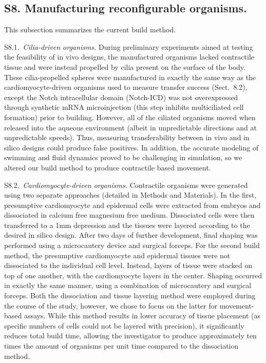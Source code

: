 \vspace{1em} 


\subsection*{S8. Manufacturing reconfigurable organisms.}

This subsection summarizes the current build method.

\vspace{1em}

S8.1.~\textit{Cilia-driven organisms.}
During preliminary experiments aimed at testing the feasibility of in vivo designs, the manufactured organisms lacked contractile tissue and were instead propelled by cilia present on the surface of the body. 
These cilia-propelled spheres were manufactured in exactly the same way as the cardiomyocyte-driven organisms used to measure transfer success (Sect.~8.2), except the Notch intracellular domain (Notch-ICD) was not overexpressed through synthetic mRNA microinjection (this step inhibits multiciliated cell formation) prior to building. 
However, all of the ciliated organisms moved when released into the aqueous environment (albeit in unpredictable directions and at unpredictable speeds). 
Thus, measuring transferability between in vivo and in silico designs could produce false positives. 
In addition, the accurate modeling of swimming and fluid dynamics proved to be challenging in simulation, so we altered our build method to produce contractile based movement.

\vspace{1em}

S8.2.~\textit{Cardiomyocyte-driven organisms.}
Contractile organisms were generated using two separate approaches (detailed in Methods and Materials). 
In the first, presumptive cardiomyocyte and epidermal cells were extracted from embryos and dissociated in calcium free magnesium free medium. Dissociated cells were then transferred to a 1mm depression and the tissues were layered according to the desired in silico design. 
After two days of further development, final shaping was performed using a microcautery device and surgical forceps. 
For the second build method, the presumptive cardiomyocyte and epidermal tissues were not dissociated to the individual cell level. 
Instead, layers of tissue were stacked on top of one another, with the cardiomyocyte layers in the center. 
Shaping occurred in exactly the same manner, using a combination of microcautery and surgical forceps. 
Both the dissociation and tissue layering method were employed during the course of the study, however, we chose to focus on the latter for movement-based assays. 
While this method results in lower accuracy of tissue placement (as specific numbers of cells could not be layered with precision), it significantly reduces total build time, allowing the investigator to produce approximately ten times the amount of organisms per unit time compared to the dissociation method.


